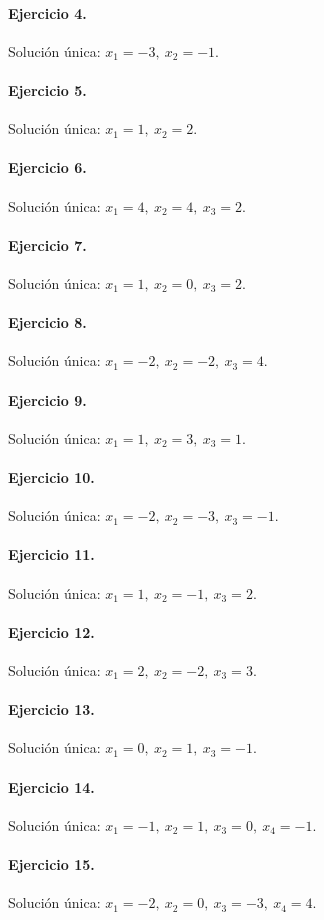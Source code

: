 \documentclass[12pt]{article}
\theoremstyle{remark}
\begin{document}
\paragraph{Ejercicio 4.} Solución única: \(x_{1}=-3,\ x_{2}=-1\).
\paragraph{Ejercicio 5.} Solución única: \(x_{1}=1,\ x_{2}=2\).
\paragraph{Ejercicio 6.} Solución única: \(x_{1}=4,\ x_{2}=4,\ x_{3}=2\).
\paragraph{Ejercicio 7.} Solución única: \(x_{1}=1,\ x_{2}=0,\ x_{3}=2\).
\paragraph{Ejercicio 8.} Solución única: \(x_{1}=-2,\ x_{2}=-2,\ x_{3}=4\).
\paragraph{Ejercicio 9.} Solución única: \(x_{1}=1,\ x_{2}=3,\ x_{3}=1\).
\paragraph{Ejercicio 10.} Solución única: \(x_{1}=-2,\ x_{2}=-3,\ x_{3}=-1\).
\paragraph{Ejercicio 11.} Solución única: \(x_{1}=1,\ x_{2}=-1,\ x_{3}=2\).
\paragraph{Ejercicio 12.} Solución única: \(x_{1}=2,\ x_{2}=-2,\ x_{3}=3\).
\paragraph{Ejercicio 13.} Solución única: \(x_{1}=0,\ x_{2}=1,\ x_{3}=-1\).
\paragraph{Ejercicio 14.} Solución única: \(x_{1}=-1,\ x_{2}=1,\ x_{3}=0,\ x_{4}=-1\).
\paragraph{Ejercicio 15.} Solución única: \(x_{1}=-2,\ x_{2}=0,\ x_{3}=-3,\ x_{4}=4\).
\end{document}
